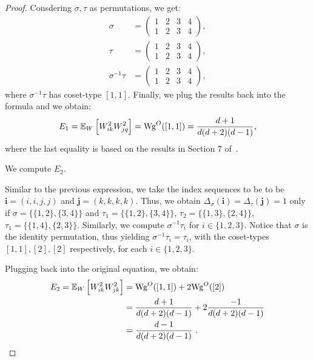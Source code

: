 \begin{proof}
Consdering $\sigma, \tau$ as permutations, we get:
\begin{align}
    \sigma &= \begin{pmatrix}
                1 & 2 & 3 & 4\\
                1 & 2 & 3 & 4
                \end{pmatrix},  \\
    \tau &= \begin{pmatrix}
                1 & 2 & 3 & 4\\
                1 & 2 & 3 & 4
                \end{pmatrix}, \\
    \sigma^{-1} \tau &= \begin{pmatrix}
                1 & 2 & 3 & 4\\
                1 & 2 & 3 & 4
                \end{pmatrix},
\end{align}
where $\sigma^{-1} \tau$ has coset-type $[1, 1]$. Finally, we plug the results back into the formula and we obtain:
\[
    E_1 = \mathbb{E}_W \left[W_{ik}^2 W_{jq}^2 \right] 
    = \text{Wg}^O([1, 1]) 
    = \frac{d+1}{d(d+2)(d-1)},
\]
where the last equality is based on the results in Section 7 of~\cite{collins2009some}.

We compute $E_2$.

Similar to the previous expression, we take the index sequences to be to be $\boldsymbol{i} = (i, i, j, j)$ and $\boldsymbol{j} = (k, k, k, k)$. Thus, we obtain $\Delta_\sigma(\boldsymbol{i}) = \Delta_{\tau}(\boldsymbol{j}) = 1$ only if $\sigma = \{ \{1, 2\}, \{3, 4\} \}$ and $\tau_1 = \{ \{1, 2\}, \{3, 4\} \}$, $\tau_2 = \{ \{1, 3\}, \{2, 4\} \}$, $\tau_1 = \{ \{1, 4\}, \{2, 3\} \}$. Similarly, we compute $\sigma^{-1} \tau_i$ for $i \in \{1,2,3\}$. Notice that $\sigma$ is the identity permutation, thus yielding $\sigma^{-1} \tau_i = \tau_i$, with the coset-types $[1, 1], [2], [2]$ respectively, for each $i \in \{1, 2, 3\}$.

Plugging back into the original equation, we obtain:
\begin{align}
    E_2 = \mathbb{E}_W \left[W_{ik}^2 W_{jk}^2 \right] 
    &= \text{Wg}^O([1, 1]) + 2 \text{Wg}^O([2]) \\ 
    &= \frac{d+1}{d(d+2)(d-1)} + 2 \frac{-1}{d(d+2)(d-1)} \\
    &= \frac{d-1}{d(d+2)(d-1)}~.
\end{align}


\end{proof}
